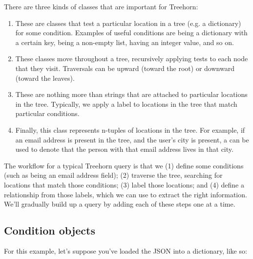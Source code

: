 \documentclass[letterpaper,10pt,english]{sphinxmanual}
\begin{document}
There are three kinds of classes that are important for Treehorn:
\begin{enumerate}
\def\theenumi{\arabic{enumi}}
\def\labelenumi{\theenumi .}
\makeatletter\def\p@enumii{\p@enumi \theenumi .}\makeatother
\item {} 
 \textendash{} These are classes that test a particular location in a tree (e.g. a dictionary) for some condition. Examples of useful conditions are being a dictionary with a certain key, being a non-empty list, having an integer value, and so on.

\item {} 
 \textendash{} These classes move throughout a tree, recursively applying tests to each node that they visit. Traversals can be upward (toward the root) or downward (toward the leaves).

\item {} 
 \textendash{} These are nothing more than strings that are attached to particular locations in the tree. Typically, we apply a label to locations in the tree that match particular conditions.

\item {} 
 \textendash{} Finally, this class represents n-tuples of locations in the tree. For example, if an email address is present in the tree, and the user’s city is present, a  can be used to denote that the person with that email address lives in that city.

\end{enumerate}

The workflow for a typical Treehorn query is that we (1) define some conditions (such as being an email address field); (2) traverse the tree, searching for locations that match those conditions; (3) label those locations; and (4) define a relationship from those labels, which we can use to extract the right information. We’ll gradually build up a query by adding each of these steps one at a time.


\subsection{Condition objects}
\label{\detokenize{treehorn:condition-objects}}
For this example, let’s suppose you’ve loaded the JSON into a dictionary, like so:

%
\begin{sphinxVerbatim}[commandchars=\\\{\}]
 

    
      
\end{sphinxVerbatim}
\end{document}
